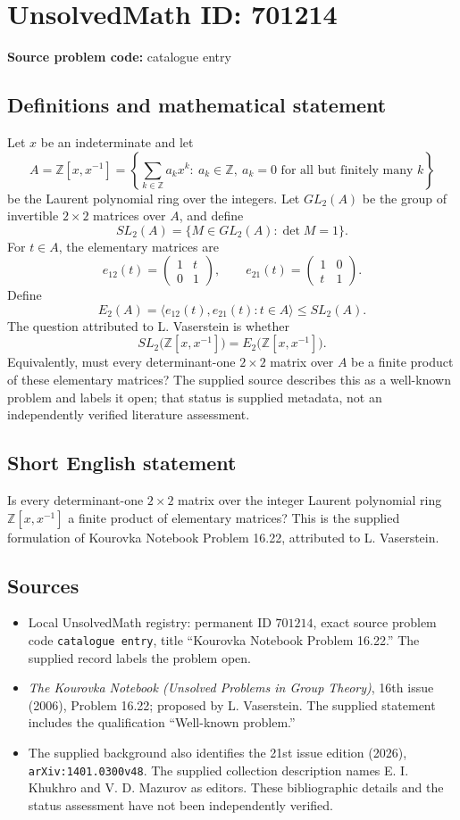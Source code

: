 \documentclass[11pt]{article}
\newcommand{\Z}{\mathbb{Z}}
\begin{document}
\section*{UnsolvedMath ID: 701214}
\textbf{Source problem code:} catalogue entry
\subsection{Definitions and mathematical statement}
Let \(x\) be an indeterminate and let
\[
A=\Z[x,x^{-1}]
 =\left\{\sum_{k\in\Z}a_kx^k:\ a_k\in\Z,\ a_k=0\text{ for all but finitely many }k\right\}
\]
be the Laurent polynomial ring over the integers. Let \(GL_2(A)\) be the group of invertible \(2\times2\) matrices over \(A\), and define
\[
SL_2(A)=\{M\in GL_2(A):\det M=1\}.
\]
For \(t\in A\), the elementary matrices are
\[
e_{12}(t)=\begin{pmatrix}1&t\\0&1\end{pmatrix},\qquad
e_{21}(t)=\begin{pmatrix}1&0\\t&1\end{pmatrix}.
\]
Define
\[
E_2(A)=\bigl\langle e_{12}(t),e_{21}(t):t\in A\bigr\rangle\leq SL_2(A).
\]
The question attributed to L. Vaserstein is whether
\[
SL_2\bigl(\Z[x,x^{-1}]\bigr)=E_2\bigl(\Z[x,x^{-1}]\bigr).
\]
Equivalently, must every determinant-one \(2\times2\) matrix over \(A\) be a finite product of these elementary matrices? The supplied source describes this as a well-known problem and labels it open; that status is supplied metadata, not an independently verified literature assessment.
\subsection{Short English statement}
Is every determinant-one \(2\times2\) matrix over the integer Laurent polynomial ring \(\Z[x,x^{-1}]\) a finite product of elementary matrices? This is the supplied formulation of Kourovka Notebook Problem 16.22, attributed to L. Vaserstein.
\subsection{Sources}
\begin{itemize}
\item Local UnsolvedMath registry: permanent ID \(701214\), exact source problem code \texttt{catalogue entry}, title ``Kourovka Notebook Problem 16.22.'' The supplied record labels the problem open.
\item \emph{The Kourovka Notebook (Unsolved Problems in Group Theory)}, 16th issue (2006), Problem 16.22; proposed by L. Vaserstein. The supplied statement includes the qualification ``Well-known problem.''
\item The supplied background also identifies the 21st issue edition (2026), \texttt{arXiv:1401.0300v48}. The supplied collection description names E. I. Khukhro and V. D. Mazurov as editors. These bibliographic details and the status assessment have not been independently verified.
\end{itemize}
\end{document}
